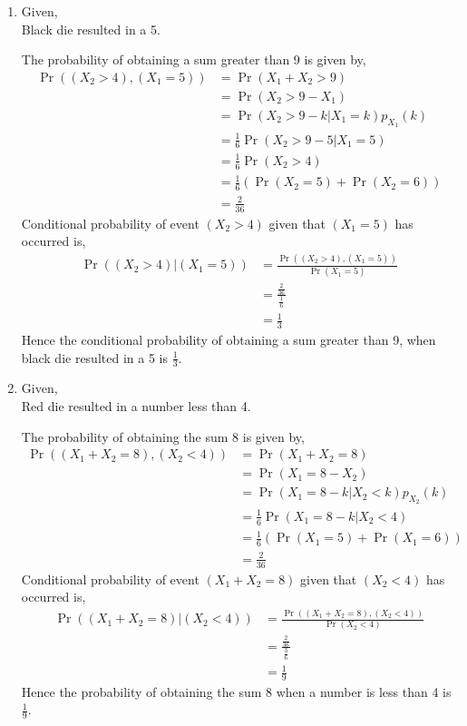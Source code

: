\documentclass[10pt,twocolumn]{article}
\providecommand{\pr}[1]{\ensuremath{\Pr\left(#1\right)}}
\providecommand{\brak}[1]{\ensuremath{\left(#1\right)}}
\begin{document}
\begin{enumerate}
\item 
Given, \\
Black die resulted in a 5. 

The probability of obtaining a sum greater than 9 is given by,
\begin{align}
\Pr{\brak{\brak{X_2 > 4},\brak{X_1=5}}}
&= \pr{X_1 + X_2 > 9} \\
&= \pr{X_2  > 9 -X_1} \\
&= \pr{X_2  > 9 -k | X_1 = k}p_{X_1}(k) \\
&= \frac{1}{6} \pr{X_2  > 9 -5 | X_1 = 5} \\
&= \frac{1}{6} \pr{X_2 > 4} \\
&= \frac{1}{6} (\pr{X_2 = 5} + \pr{X_2 = 6}) \\
&= \frac{2}{36}
\end{align}
Conditional probability of event $(X_2 > 4)$ given that $(X_1 = 5)$ has occurred is, 
\begin{align}
\Pr{\brak{\brak{X_2 > 4}|\brak{X_1=5}}}
&=\frac{\Pr{((X_2 > 4),(X_1=5))}}{\Pr{\brak{X_1=5}}}\\
&=\frac{\frac{2}{36}}{\frac{1}{6}}\\
&=\frac{1}{3}
\end{align}  
Hence the conditional probability of obtaining a sum greater than 9, when black die resulted in a 5 is $\frac{1}{3}$. 

\newpage
\item Given, \\
Red die resulted in a number less than 4. 

The probability of obtaining the sum 8 is given by,
\begin{align}
\Pr{\brak{\brak{X_1 + X_2 = 8},\brak{X_2<4}}} 
&= \pr{X_1 + X_2 = 8} \\
&= \pr{X_1  = 8 -X_2} \\
&= \pr{X_1  = 8 -k | X_2 < k}p_{X_2}(k) \\
&= \frac{1}{6} \pr{X_1  = 8 -k | X_2 < 4} \\
&= \frac{1}{6} (\pr{X_1 = 5} + \pr{X_1 = 6}) \\
&= \frac{2}{36}
\end{align}
Conditional probability of event $(X_1 + X_2 = 8)$ given that $(X_2 < 4)$ has occurred is, 
\begin{align}
\Pr{\brak{\brak{X_1 + X_2 = 8}|\brak{X_2<4}}} 
&= \frac{\Pr{((X_1 + X_2 = 8),(X_2 < 4))}}{\Pr{\brak{X_2 < 4}}} \\
&= \frac{\frac{2}{36}}{\frac{3}{6}}\\
&= \frac{1}{9}
\end{align} 
Hence the probability of obtaining the sum 8 when a number is less than 4 is $\frac{1}{9}$. 
\end{enumerate}
\end{document}
